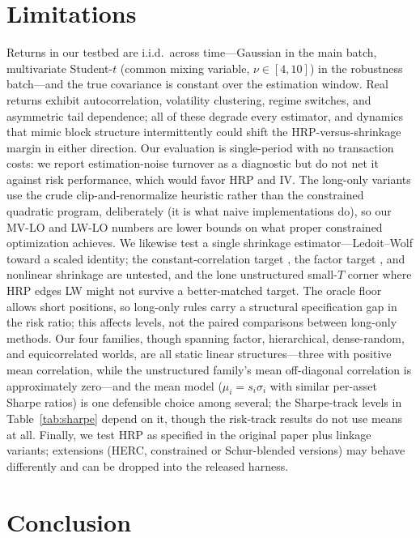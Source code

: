 \documentclass[11pt]{article}
\begin{document}
\section{Limitations}
\label{sec:limitations}

Returns in our testbed are i.i.d.\ across time---Gaussian in the main batch,
multivariate Student-$t$ (common mixing variable, $\nu\in[4,10]$) in the
robustness batch---and the true covariance is constant over the estimation
window. Real returns exhibit autocorrelation, volatility clustering, regime
switches, and asymmetric tail dependence; all of these degrade every
estimator, and dynamics that mimic block structure intermittently could
shift the HRP-versus-shrinkage margin in either direction. Our evaluation is
single-period with no transaction costs: we report estimation-noise turnover
as a diagnostic but do not net it against risk performance, which would
favor HRP and IV. The long-only variants use the crude clip-and-renormalize
heuristic rather than the constrained quadratic program, deliberately (it is
what naive implementations do), so our MV-LO and LW-LO numbers are lower
bounds on what proper constrained optimization achieves. We likewise test a
single shrinkage estimator---Ledoit--Wolf toward a scaled identity; the
constant-correlation target \citep{ledoit2004honey}, the factor target
\citep{ledoit2003improved}, and nonlinear shrinkage are untested, and the
lone unstructured small-$T$ corner where HRP edges LW might not survive a
better-matched target. The oracle floor
allows short positions, so long-only rules carry a structural specification
gap in the risk ratio; this affects levels, not the paired comparisons
between long-only methods. Our four families, though spanning factor,
hierarchical, dense-random, and equicorrelated worlds, are all static linear
structures---three with positive mean correlation, while the unstructured
family's mean off-diagonal correlation is approximately zero---and the mean
model
($\mu_i=s_i\sigma_i$ with similar per-asset Sharpe ratios) is one
defensible choice among several; the Sharpe-track levels in
Table~\ref{tab:sharpe} depend on it, though the risk-track results do not
use means at all. Finally, we test HRP as specified in the original paper
plus linkage variants; extensions (HERC, constrained or Schur-blended
versions) may behave differently and can be dropped into the released
harness.

\section{Conclusion}
\label{sec:conclusion}
\end{document}

